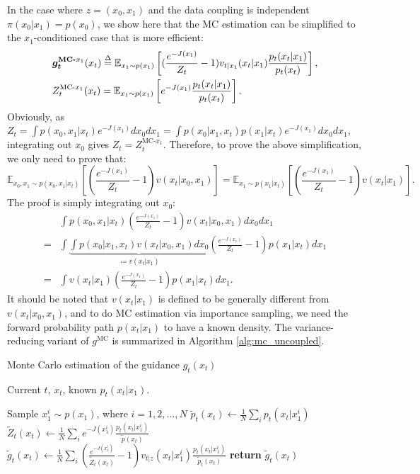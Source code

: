 In the case where $z=(x_0,x_1)$ and the data coupling is independent $\pi(x_0|x_1) = p(x_0)$, we show here that the MC estimation can be simplified to the $x_1$-conditioned case that is more efficient:
\begin{align}
&    \bm{g_t}^{\textbf{MC-$x_1$}}(x_t) \overset{\Delta}{=} \mathbb{E}_{x_1\sim p(x_1)} 
\left[
(\frac{e^{-J(x_1)}}{Z_t} - 1) v_{t|x_1}(x_t|x_1) \frac{p_t(x_t|x_1)}{p_t(x_t)}
\right],
\\
& Z_t^{\text{MC-$x_1$}}(x_t) = \mathbb{E}_{x_1\sim p(x_1)} 
\left[
e^{-J(x_1)} \frac{p_t(x_t|x_1)}{p_t(x_t)} 
\right].
\end{align}
Obviously, as $Z_t = \int p(x_0,x_1|x_t) e^{-J(x_1)}dx_0dx_1 = \int p(x_0|x_1,x_t)p(x_1|x_t) e^{-J(x_1)}dx_0dx_1 $, integrating out $x_0$ gives $Z_t = Z^{\text{MC-$x_1$}}_t$. Therefore, to prove the above simplification, we only need to prove that:
\begin{equation}
    \mathbb{E}_{x_0,x_1\sim p(x_0,x_1|x_t)}\left[(\frac{e^{-J(x_1)}}{Z_t} - 1)  v(x_t|x_0,x_1)\right] = \mathbb{E}_{x_1\sim p(x_1|x_t)}\left[(\frac{e^{-J(x_1)}}{Z_t} - 1)  v(x_t|x_1)\right].
\end{equation}
The proof is simply integrating out $x_0$:
\begin{align}
    \nonumber&\int p(x_0,x_1|x_t) (\frac{e^{-J(x_1)}}{Z_t} - 1)  v(x_t|x_0,x_1) dx_0 dx_1 \\
    \nonumber=& \int \underbrace{\int p(x_0|x_1,x_t)v(x_t|x_0,x_1)dx_0}_{\coloneqq v(x_t|x_1)} (\frac{e^{-J(x_1)}}{Z_t} - 1) p(x_1|x_t) dx_1 \\
    =& \int v(x_t|x_1) (\frac{e^{-J(x_1)}}{Z_t} - 1) p(x_1|x_t) dx_1.
\end{align}
It should be noted that $v(x_t|x_1)$ is defined to be generally different from $v(x_t|x_0,x_1)$, and to do MC estimation via importance sampling, we need the forward probability path $p(x_t|x_1)$ to have a known density. The variance-reducing variant of $g^{\text{MC}}$ is summarized in Algorithm \ref{alg:mc_uncoupled}.

\begin{algorithm}[H]
\caption{Monte Carlo estimation of the guidance $g_t(x_t)$}
\label{alg:mc_uncoupled}
\begin{algorithmic}[1]
\REQUIRE Current $t$, $x_t$, known $p_t(x_t|x_1)$.

\STATE Sample $x_1^i \sim p(x_1)$, where $i=1,2,...,N$
\STATE $\tilde{p}_t(x_t) \gets \frac{1}{N} \sum_i p_t(x_t|x_1^i)$
\STATE $\tilde{Z}_t(x_t) \gets \frac{1}{N} \sum_i e^{-J(x_{1}^i)} \frac{p_t(x_t|x_1^i)}{\tilde{p}(x_t)}$
\STATE $\tilde{g}_t(x_t) \gets \frac{1}{N} \sum_i (\frac{e^{-J(x_{1}^i)}}{\tilde{Z}_t(x_t)} - 1) v_{t|z}(x_t|x_1^i) \frac{p_t(x_t|x_1^i)}{\tilde{p}_t(x_t)}$
\STATE \textbf{return} $\tilde{g}_t(x_t)$
\end{algorithmic}
\end{algorithm}

